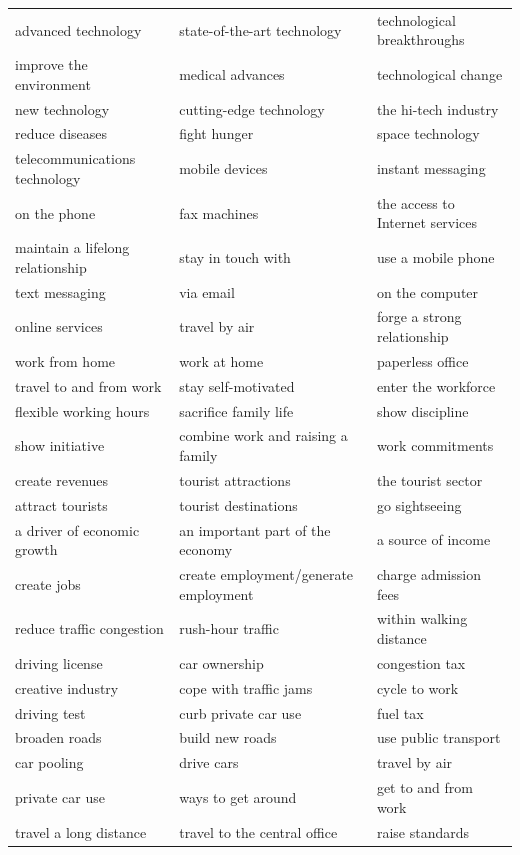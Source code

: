 \documentclass[10pt,a4paper]{article}
\begin{document}
{\begin{longtable}{@{}*{3}{p{}}@{}}
advanced technology & state-of-the-art technology & technological breakthroughs \\
improve the environment & medical advances & technological change \\
new technology & cutting-edge technology & the hi-tech industry \\
reduce diseases & fight hunger & space technology \\
telecommunications technology & mobile devices & instant messaging \\
on the phone & fax machines & the access to Internet services \\
maintain a lifelong relationship & stay in touch with & use a mobile phone \\
text messaging & via email & on the computer \\
online services & travel by air & forge a strong relationship \\
work from home & work at home & paperless office \\
travel to and from work & stay self-motivated & enter the workforce \\
flexible working hours & sacrifice family life & show discipline \\
show initiative & combine work and raising a family & work commitments \\
create revenues & tourist attractions & the tourist sector \\
attract tourists & tourist destinations & go sightseeing \\
a driver of economic growth & an important part of the economy & a source of income \\
create jobs & create employment/generate employment & charge admission fees \\
reduce traffic congestion & rush-hour traffic & within walking distance \\
driving license & car ownership & congestion tax \\
creative industry & cope with traffic jams & cycle to work \\
driving test & curb private car use & fuel tax \\
broaden roads & build new roads & use public transport \\
car pooling & drive cars & travel by air \\
private car use & ways to get around & get to and from work \\
travel a long distance & travel to the central office & raise standards \\

\end{longtable}}
\end{document}
